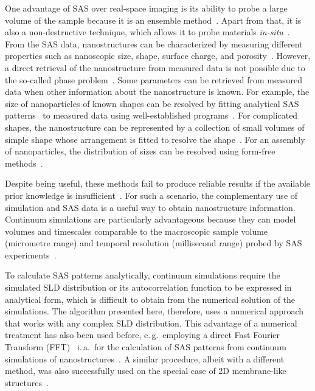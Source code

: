 \documentclass[preprint, 5p, times, twocolumn]{elsarticle}
\begin{document}
One advantage of SAS over real-space imaging is its ability to probe a large volume of the sample because it is an ensemble method~\cite{sivia2011elementary}. Apart from that, it is also a non-destructive technique, which allows it to probe materials \textit{in-situ}~\cite{hosseini2021neutron}. From the SAS data, nanostructures can be characterized by measuring different properties such as nanoscopic size, shape, surface charge, and porosity~\cite{modena2019nanoparticle}. However, a direct retrieval of the nanostructure from measured data is not possible due to the so-called phase problem~\cite{sivia2011elementary}. Some parameters can be retrieved from measured data when other information about the nanostructure is known. For example, the size of nanoparticles of known shapes can be resolved by fitting analytical SAS patterns~\cite{guinier1955small, porod1960formfactors} to measured data using well-established programs~\cite{sasviewwebsite}. For complicated shapes, the nanostructure can be represented by a collection of small volumes of simple shape whose arrangement is fitted to resolve the shape~\cite{alves2018calculation}. For an assembly of nanoparticles, the distribution of sizes can be resolved using form-free methods~\cite{pauw2013improvements, hollamby2013practical}.

Despite being useful, these methods fail to produce reliable results if the available prior knowledge is insufficient~\cite{hollamby2013practical}. For such a scenario, the complementary use of simulation and SAS data is a useful way to obtain nanostructure information. Continuum simulations are particularly advantageous because they can model volumes and timescales comparable to the macroscopic sample volume (micrometre range) and temporal resolution (millisecond range) probed by SAS experiments~\cite{hollamby2013practical}.

To calculate SAS patterns analytically, continuum simulations require the simulated SLD distribution or its autocorrelation function to be expressed in analytical form, which is difficult to obtain from the numerical solution of the simulations. The algorithm presented here, therefore, uses a numerical approach that works with any complex SLD distribution. This advantage of a numerical treatment has also been used before, e.\,g.\ employing a direct Fast Fourier Transform (FFT)~\cite{schmidt2007simulation} i.\,a.\ for the calculation of SAS patterns from continuum simulations of nanostructures~\cite{berbenni2025simulation}. A similar procedure, albeit with a different method, was also successfully used on the special case of 2D membrane-like structures~\cite{dorrell2020combined, umcp}.
\end{document}
